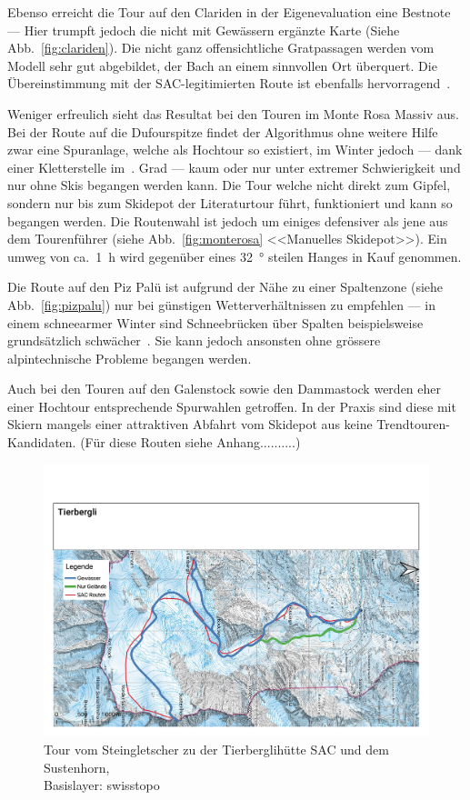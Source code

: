 \begin{multicols}{2}
Ebenso erreicht die Tour auf den Clariden in der Eigenevaluation eine Bestnote --- Hier trumpft jedoch die nicht mit Gewässern ergänzte Karte (Siehe Abb.\ \ref{fig:clariden}). Die nicht ganz offensichtliche Gratpassagen werden vom Modell sehr gut abgebildet, der Bach an einem sinnvollen Ort überquert. Die Übereinstimmung mit der SAC-legitimierten Route ist ebenfalls hervorragend~\cite{twslstgallappzll}.

Weniger erfreulich sieht das Resultat bei den Touren im Monte Rosa Massiv aus. Bei der Route auf die Dufourspitze findet der Algorithmus ohne weitere Hilfe zwar eine Spuranlage, welche als Hochtour so existiert, im Winter jedoch --- dank einer Kletterstelle im~. Grad --- kaum oder nur unter extremer Schwierigkeit und nur ohne Skis begangen werden kann. 
Die Tour welche nicht direkt zum Gipfel, sondern nur bis zum Skidepot der Literaturtour führt, funktioniert und kann so begangen werden. Die Routenwahl ist jedoch um einiges defensiver als jene aus dem Tourenführer (siehe Abb.\ \ref{fig:monterosa} <<Manuelles Skidepot>>). Ein umweg von ca.\ \qty{1}{h} wird gegenüber eines \qty{32}{°} steilen Hanges in Kauf genommen.

Die Route auf den Piz Palü ist aufgrund der Nähe zu einer Spaltenzone (siehe Abb.\ \ref{fig:pizpalu}) nur bei günstigen Wetterverhältnissen zu empfehlen --- in einem schneearmer Winter sind Schneebrücken über Spalten beispielsweise grundsätzlich schwächer~\cite{bergsteigenErhhtesRisiko}. Sie kann jedoch ansonsten ohne grössere alpintechnische Probleme begangen werden.

Auch bei den Touren auf den Galenstock sowie den Dammastock werden eher einer Hochtour entsprechende Spurwahlen getroffen. In der Praxis sind diese mit Skiern mangels einer attraktiven Abfahrt vom Skidepot aus keine Trendtouren-Kandidaten. (Für diese Routen siehe Anhang..........)

\begin{Mappage}
{
  \begin{figure}[H]
    \centering
    \includegraphics[page=1,width=.9\linewidth]{./../evaluation/PDFs/Tierbergli.pdf}
    \caption{Tour vom Steingletscher zu der Tierberglihütte SAC und dem Sustenhorn, \\Basislayer: swisstopo}\label{fig:tierbergli}
    \end{figure}

}
\end{Mappage}
\end{multicols}
